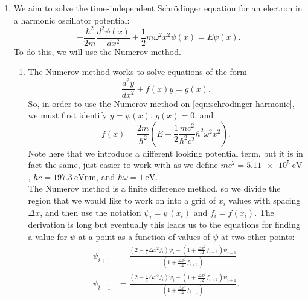 \documentclass[11pt]{article}
\begin{document}
\begin{enumerate}
\begin{enumerate}
\begin{enumerate}
        \end{enumerate}

    \end{enumerate}

    \item We aim to solve the time-independent Schr\"odinger equation for an electron in a harmonic oscillator potential:
    \begin{equation}
        -\frac{\hbar^2}{2m}\frac{d^2\psi(x)}{dx^2}+\frac{1}{2}m\omega^2x^2\psi(x)=E\psi(x).
        \label{eqn:schrodinger harmonic}
    \end{equation}
    To do this, we will use the Numerov method. 
    \begin{enumerate}
        \item The Numerov method works to solve equations of the form
        \begin{equation}
            \frac{d^2y}{dx^2}+f(x)y=g(x).
            \label{eqn:numerov general}
        \end{equation}
        So, in order to use the Numerov method on \cref{eqn:schrodinger harmonic}, we must first identify $y=\psi(x)$, $g(x)=0$, and 
        \begin{equation}
            f(x)=\frac{2m}{\hbar^2}\left(E-\frac{1}{2}\frac{mc^2}{\hbar^2c^2}\hbar^2\omega^2x^2\right).
            \label{eqn:numerov f}
        \end{equation}
        Note here that we introduce a different looking potential term, but it is in fact the same, just easier to work with as we define $mc^2=\SI{5.11e5}{\electronvolt}$, $\hbar c=\SI{197.3}{\electronvolt\nano\metre}$, and $\hbar\omega=\SI{1}{\electronvolt}$. \\
        The Numerov method is a finite difference method, so we divide the region that we would like to work on into a grid of $x_i$ values with spacing $\Delta x$, and then use the notation $\psi_i=\psi(x_i)$ and $f_i=f(x_i)$. The derivation is long but eventually this leads us to the equations for finding a value for $\psi$ at a point as a function of values of $\psi$ at two other points:
        \begin{align}
            \psi_{i+1}&=\frac{\left(2-\frac{5}{6}\Delta x^2 f_i\right)\psi_i - \left(1+\frac{\Delta x^2}{12}f_{i-1}\right)\psi_{i-1}}{\left(1+\frac{\Delta x^2}{12}f_{i+1}\right)} \label{eqn:numerov update forwards}\\
            \psi_{i-1}&=\frac{\left(2-\frac{5}{6}\Delta x^2 f_i\right)\psi_i - \left(1+\frac{\Delta x^2}{12}f_{i+1}\right)\psi_{i+1}}{\left(1+\frac{\Delta x^2}{12}f_{i-1}\right)}. \label{eqn:numerov update backards}

\end{align}
\end{enumerate}
\end{enumerate}
\end{document}
